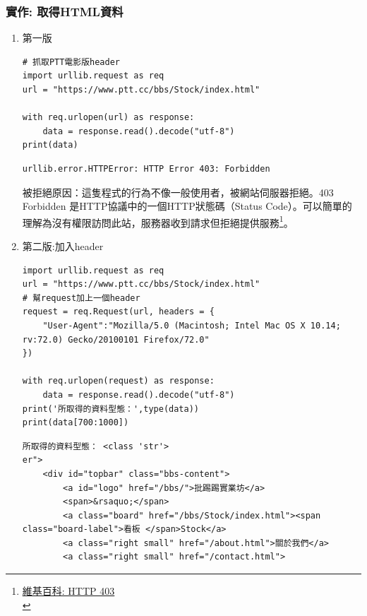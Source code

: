 \documentclass[a4paper,12pt]{article}
\begin{document}
\subsubsection{實作: 取得HTML資料}
\label{sec:org83b4602}
\begin{enumerate}
\item 第一版
\label{sec:org728b532}
\lstset{breaklines=true,language=Python,label= ,caption= ,captionpos=b,firstnumber=1,numbers=left}
\begin{lstlisting}
# 抓取PTT電影版header
import urllib.request as req
url = "https://www.ptt.cc/bbs/Stock/index.html"

with req.urlopen(url) as response:
    data = response.read().decode("utf-8")
print(data)
\end{lstlisting}

\begin{verbatim}
urllib.error.HTTPError: HTTP Error 403: Forbidden
\end{verbatim}

被拒絕原因：這隻程式的行為不像一般使用者，被網站伺服器拒絕。403 Forbidden 是HTTP協議中的一個HTTP狀態碼（Status Code）。可以簡單的理解為沒有權限訪問此站，服務器收到請求但拒絕提供服務\footnote{\href{https://zh.wikipedia.org/wiki/HTTP\_403}{維基百科: HTTP 403} \\}。\\

\item 第二版:加入header
\label{sec:orgc3fa9dd}
\lstset{breaklines=true,language=Python,label= ,caption= ,captionpos=b,firstnumber=1,numbers=left}
\begin{lstlisting}
import urllib.request as req
url = "https://www.ptt.cc/bbs/Stock/index.html"
# 幫request加上一個header
request = req.Request(url, headers = {
    "User-Agent":"Mozilla/5.0 (Macintosh; Intel Mac OS X 10.14; rv:72.0) Gecko/20100101 Firefox/72.0"
})

with req.urlopen(request) as response:
    data = response.read().decode("utf-8")
print('所取得的資料型態：',type(data))
print(data[700:1000])
\end{lstlisting}

\begin{verbatim}
所取得的資料型態： <class 'str'>
er">
	<div id="topbar" class="bbs-content">
		<a id="logo" href="/bbs/">批踢踢實業坊</a>
		<span>&rsaquo;</span>
		<a class="board" href="/bbs/Stock/index.html"><span class="board-label">看板 </span>Stock</a>
		<a class="right small" href="/about.html">關於我們</a>
		<a class="right small" href="/contact.html">
\end{verbatim}
\end{enumerate}
\end{document}
